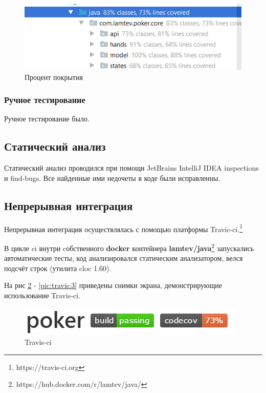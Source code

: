 \begin{figure}[H]
	\begin{center}
		\includegraphics[scale=0.5]{pics/coverage.png}
	    \caption{Процент покрытия} 
		\label{pic:test:1}
	\end{center}
\end{figure}

\subsubsection*{Ручное тестирование}

Ручное тестирование было.

\subsection*{Статический анализ}

Статический анализ проводился при помощи JetBrains IntelliJ IDEA inspections и find-bugs. Все найденные ими недочеты в коде были исправленны.

\subsection*{Непрерывная интеграция}

Непрерывная интеграция осуществлялась с помощью платформы Travic-ci.\footnote{https://travis-ci.org}
	
В цикле ci внутри cобственного \textbf{docker} контейнера \textbf{lamtev/java}\footnote{https://hub.docker.com/r/lamtev/java/} запускались автоматические тесты, код анализировался статическим анализатором, велся подсчёт строк (утилита cloc 1.60).

На рис \ref{pic:travis:1} - \ref{pic:travis:3} приведены снимки экрана, демонстрирующие использование Travis-ci.

\begin{figure}[H]
	\begin{center}
		\includegraphics[scale=0.75]{pics/travis1.png}
	    \caption{Travis-ci} 
		\label{pic:travis:1}
	\end{center}
\end{figure}

